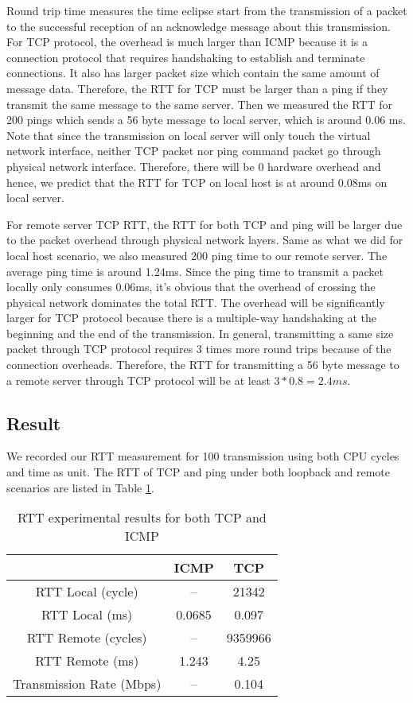 Round trip time measures the time eclipse start from the transmission of a packet to the successful reception of an acknowledge message about this transmission. For TCP protocol, the overhead is much larger than ICMP because it is a connection protocol that requires handshaking to establish and terminate connections. It also has larger packet size which contain the same amount of message data. Therefore, the RTT for TCP must be larger than a ping if they transmit the same message to the same server. Then we measured the RTT for 200 pings which sends a 56 byte message to local server, which is around 0.06 ms. Note that since the transmission on local server will only touch the virtual network interface, neither TCP packet nor ping command packet go through physical network interface. Therefore,  there will be 0 hardware overhead and hence, we predict that the RTT for TCP on local host is at around 0.08ms on local server.

For remote server TCP RTT, the RTT for both TCP and ping will be larger due to the packet overhead through physical network layers. Same as what we did for local host scenario, we also measured 200 ping time to our remote server. The average ping time is around 1.24ms. Since the ping time to transmit a packet locally only consumes 0.06ms, it's obvious that the overhead of crossing the physical network dominates the total RTT. The overhead will be significantly larger for TCP protocol because there is a multiple-way handshaking at the beginning and the end of the transmission. In general, transmitting a same size packet through TCP protocol requires 3 times more round trips because of the connection overheads. Therefore, the RTT for transmitting a 56 byte message to a remote server through TCP protocol will be at least $3 * 0.8 = 2.4ms$.

\subsection{Result}

We recorded our RTT measurement for 100 transmission using both CPU cycles and time as unit. The RTT of TCP and ping under both loopback and remote scenarios are listed in Table \ref{rtt_result}.

\begin{table}[htbp]
\centering
\begin{tabular}{|c|c|c|}
\hline
& ICMP & TCP \\ \hline
RTT Local (cycle) & -- & 21342 \\ \hline
RTT Local (ms) & 0.0685 & 0.097 \\ \hline
RTT Remote (cycles) & -- & 9359966 \\ \hline
RTT Remote (ms) & 1.243 &  4.25 \\ \hline
Transmission Rate (Mbps) & --  & 0.104 \\ \hline
\end{tabular}
\caption{RTT experimental results for both TCP and ICMP}
\label{rtt_result}
\end{table}

